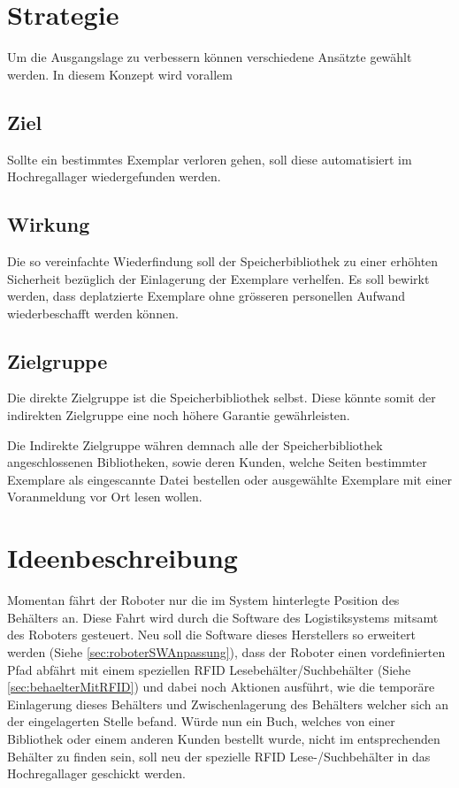 \chapter{Strategie}
Um die Ausgangslage zu verbessern können verschiedene Ansätzte gewählt werden. In diesem Konzept wird vorallem

\section{Ziel}
Sollte ein bestimmtes Exemplar verloren gehen, soll diese automatisiert im Hochregallager wiedergefunden werden.

\section{Wirkung}
Die so vereinfachte Wiederfindung soll der Speicherbibliothek zu einer erhöhten Sicherheit bezüglich der Einlagerung der Exemplare verhelfen. Es soll bewirkt werden, dass deplatzierte Exemplare ohne grösseren personellen Aufwand wiederbeschafft werden können.

\section{Zielgruppe}
Die direkte Zielgruppe ist die Speicherbibliothek selbst. Diese könnte somit der indirekten Zielgruppe eine noch höhere Garantie gewährleisten.

Die Indirekte Zielgruppe währen demnach alle der Speicherbibliothek angeschlossenen Bibliotheken, sowie deren Kunden, welche Seiten bestimmter Exemplare als eingescannte Datei bestellen oder ausgewählte Exemplare mit einer Voranmeldung vor Ort lesen wollen.

\chapter{Ideenbeschreibung}
Momentan fährt der Roboter nur die im System hinterlegte Position des Behälters an. Diese Fahrt wird durch die Software des Logistiksystems mitsamt des Roboters gesteuert. Neu soll die Software dieses Herstellers so erweitert werden (Siehe \ref{sec:roboterSWAnpassung}), dass der Roboter einen vordefinierten Pfad abfährt mit einem speziellen RFID Lesebehälter/Suchbehälter (Siehe \ref{sec:behaelterMitRFID}) und dabei noch Aktionen ausführt, wie die temporäre Einlagerung dieses Behälters und Zwischenlagerung des Behälters welcher sich an der eingelagerten Stelle befand.
Würde nun ein Buch, welches von einer Bibliothek oder einem anderen Kunden bestellt wurde, nicht im entsprechenden Behälter zu finden sein, soll neu der spezielle RFID Lese-/Suchbehälter in das Hochregallager geschickt werden.


